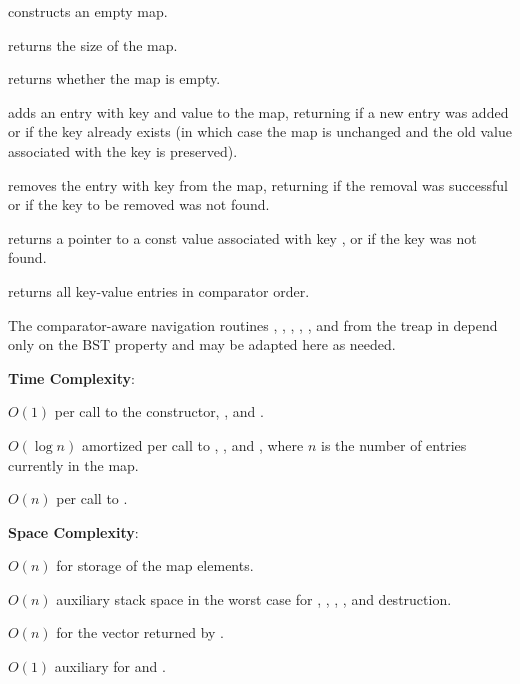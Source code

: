 \begin{compactitem}
  \item {} constructs an empty map.
  \item {} returns the size of the map.
  \item {} returns whether the map is empty.
  \item {} adds an entry with key  and value  to the map, returning  if a new entry was added or  if the key already exists (in which case the map is unchanged and the old value associated with the key is preserved).
  \item {} removes the entry with key  from the map, returning  if the removal was successful or  if the key to be removed was not found.
  \item {} returns a pointer to a const value associated with key , or  if the key was not found.
  \item {} returns all key-value entries in comparator order.
\end{compactitem}

The comparator-aware navigation routines , , , , , and  from the treap in  depend only on the BST property and may be adapted here as needed.

\textbf{Time Complexity}:
\begin{compactitem}
  \item $O(1)$ per call to the constructor, , and .
  \item $O(\log n)$ amortized per call to , , and , where $n$ is the number of entries currently in the map.
  \item $O(n)$ per call to .
\end{compactitem}

\textbf{Space Complexity}:
\begin{compactitem}
  \item $O(n)$ for storage of the map elements.
  \item $O(n)$ auxiliary stack space in the worst case for , , , , and destruction.
  \item $O(n)$ for the vector returned by .
  \item $O(1)$ auxiliary for  and .
\end{compactitem}

